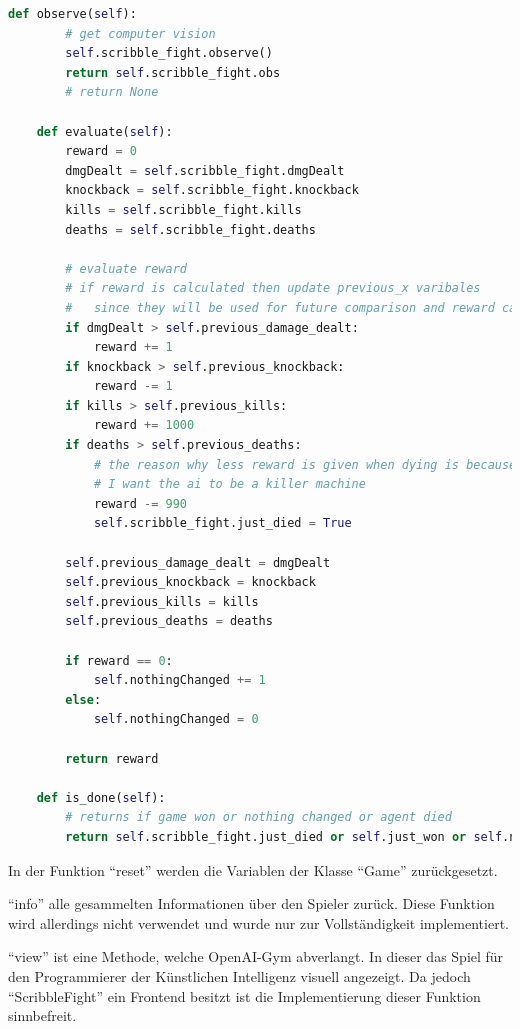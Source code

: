 \begin{lstlisting}[language=Python,firstnumber=138]
    def observe(self):
        # get computer vision
        self.scribble_fight.observe()
        return self.scribble_fight.obs
        # return None

    def evaluate(self):
        reward = 0
        dmgDealt = self.scribble_fight.dmgDealt
        knockback = self.scribble_fight.knockback
        kills = self.scribble_fight.kills
        deaths = self.scribble_fight.deaths

        # evaluate reward
        # if reward is calculated then update previous_x varibales
        #   since they will be used for future comparison and reward calculation
        if dmgDealt > self.previous_damage_dealt:
            reward += 1
        if knockback > self.previous_knockback:
            reward -= 1
        if kills > self.previous_kills:
            reward += 1000
        if deaths > self.previous_deaths:
            # the reason why less reward is given when dying is because
            # I want the ai to be a killer machine
            reward -= 990
            self.scribble_fight.just_died = True

        self.previous_damage_dealt = dmgDealt
        self.previous_knockback = knockback
        self.previous_kills = kills
        self.previous_deaths = deaths

        if reward == 0:
            self.nothingChanged += 1
        else:
            self.nothingChanged = 0

        return reward

    def is_done(self):
        # returns if game won or nothing changed or agent died
        return self.scribble_fight.just_died or self.just_won or self.nothingChanged == self.min_game_length

\end{lstlisting}

In der Funktion ``reset'' werden die Variablen der Klasse ``Game'' zurückgesetzt.

``info'' alle gesammelten Informationen über den Spieler zurück. Diese Funktion wird allerdings nicht verwendet und wurde nur zur Vollständigkeit implementiert.

``view'' ist eine Methode, welche OpenAI-Gym abverlangt. In dieser das Spiel für den Programmierer der Künstlichen Intelligenz visuell angezeigt. Da jedoch ``ScribbleFight'' ein Frontend besitzt ist die Implementierung dieser Funktion sinnbefreit.


